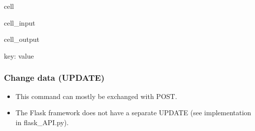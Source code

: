 \documentclass[letterpaper,10pt,english]{jupyterBook}
\begin{document}
\begin{sphinxuseclass}{cell}\begin{sphinxVerbatimInput}

\begin{sphinxuseclass}{cell_input}
\begin{sphinxVerbatim}[commandchars=\\\{\}]
  
  
\end{sphinxVerbatim}

\end{sphinxuseclass}\end{sphinxVerbatimInput}
\begin{sphinxVerbatimOutput}

\begin{sphinxuseclass}{cell_output}
\begin{sphinxVerbatim}[commandchars=\\\{\}]
\PYGZob{}\PYGZsq{}key\PYGZsq{}: \PYGZsq{}value\PYGZsq{}\PYGZcb{}
\end{sphinxVerbatim}

\end{sphinxuseclass}\end{sphinxVerbatimOutput}

\end{sphinxuseclass}

\subsubsection{Change data (UPDATE)}
\label{\detokenize{2_Data_sources/APIs/REST:change-data-update}}\begin{itemize}
\item {} 
\sphinxAtStartPar
This command can mostly be exchanged with POST.

\item {} 
\sphinxAtStartPar
The Flask framework does not have a separate UPDATE (see implementation in flask\_API.py).

\end{itemize}
\end{document}
